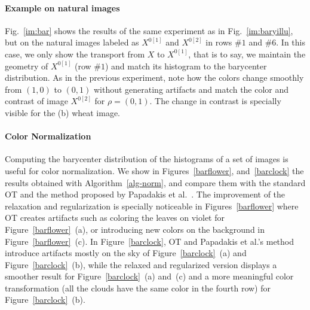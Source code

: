 \paragraph{Example on natural images} Fig.~\ref{im:bar} shows the results of the same experiment as in Fig.~\ref{im:baryillu}, but on the natural images labeled as $X^{0[1]}$ and $X^{0[2]}$ in rows $\#1$ and $\#6$. In this case, we only show the transport from $X$ to $X^{0[1]}$, that is to say, we maintain the geometry of $X^{0[1]}$ (row $\#1$) and match its histogram to the barycenter distribution. As in the previous experiment, note how the colors change smoothly from $(1,0)$ to $(0,1)$ without generating artifacts and match the color and contrast of image $X^{0[2]}$ for $\rho=(0,1)$. The change in contrast is specially visible for the (b) wheat image.

\paragraph{Color Normalization} 

Computing the barycenter distribution of the histograms of a set of images is useful for color normalization. We show in Figures~\ref{barflower}, and~\ref{barclock} the results obtained with Algorithm~\ref{alg-norm}, and compare them with the standard OT and the method proposed by Papadakis et al.~\cite{Papadakis_ip11}. The improvement of the relaxation and regularization is specially noticeable in Figures~\ref{barflower} where OT creates artifacts such as coloring the leaves on violet for Figure~\ref{barflower}~(a), or introducing new colors on the background in Figure~\ref{barflower}~(c). In Figure~\ref{barclock}, OT and Papadakis et al.'s method introduce artifacts mostly on the sky of Figure~\ref{barclock}~(a) and  Figure~\ref{barclock}~(b), while the relaxed and regularized version displays a smoother result for Figure~\ref{barclock}~(a) and~(c) and a more meaningful color transformation (all the clouds have the same color in the fourth row) for Figure~\ref{barclock}~(b).

\newcommand{\myimgZ}[1]{\texttt{[image: \#1]}}
\newcommand{\myTriTab}[1]{ \begin{tabular}{@{}c@{\hspace{2mm}}c@{\hspace{2mm}}c@{} } #1	\end{tabular} }


